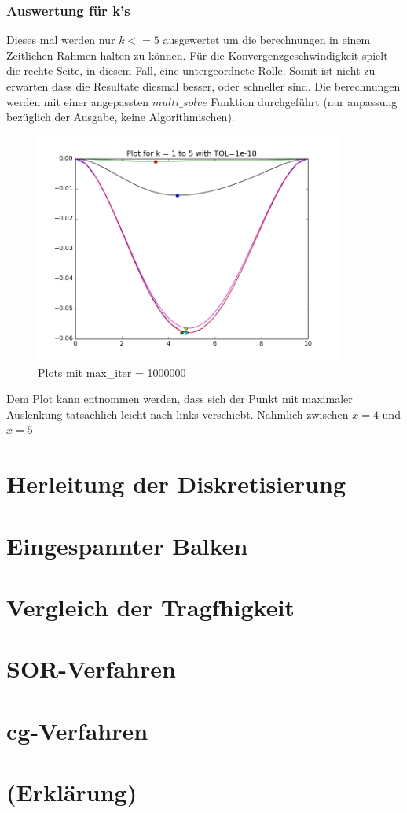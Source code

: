\documentclass[12pt,titlepage]{article}
\begin{document}
	 	\subsubsection{Auswertung für k's}
	 		Dieses mal werden nur $k<=5$ ausgewertet um die berechnungen in einem Zeitlichen Rahmen halten zu können. Für die Konvergenzgeschwindigkeit spielt die rechte Seite, 
	 		in diesem Fall, eine untergeordnete Rolle. Somit ist nicht zu erwarten dass die Resultate diesmal besser, oder schneller sind. Die berechnungen werden mit einer
	 		angepassten $multi\_solve$ Funktion durchgeführt (nur anpassung bezüglich der Ausgabe, keine Algorithmischen).
		\begin{figure}[H] 
	 		\centering
	 		\includegraphics[width=0.9\textwidth]{extra_k.png}
	 		\caption{Plots mit max\_iter = 1000000}
	 		\label{fig:Bild6}
	 	\end{figure}
	 	Dem Plot kann entnommen werden, dass sich der Punkt mit maximaler Auslenkung tatsächlich leicht nach links verschiebt. Nähmlich zwischen $x=4$ und $x=5$

\section{Herleitung der Diskretisierung}

\section{Eingespannter Balken}

\section{Vergleich der Tragfhigkeit}

\section{SOR-Verfahren}

\section{cg-Verfahren}

\section{(Erklärung)}

\newpage



\begin{thebibliography}{xxxxxxxxxxxxxxxxxxxxxxxxxxxxxxxxxxxxxx}

\end{thebibliography}
\end{document}
